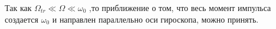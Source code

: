 \documentclass[8pt]{article}
\begin{document}
\begin{enumerate}
    Так как $\Omega_{tr} \ll \Omega \ll \omega_0$ ,то приближение о том, что весь момент импульса создается $\omega_0$ и направлен параллельно оси гироскопа, можно принять.

    \end{enumerate}
\end{document}
